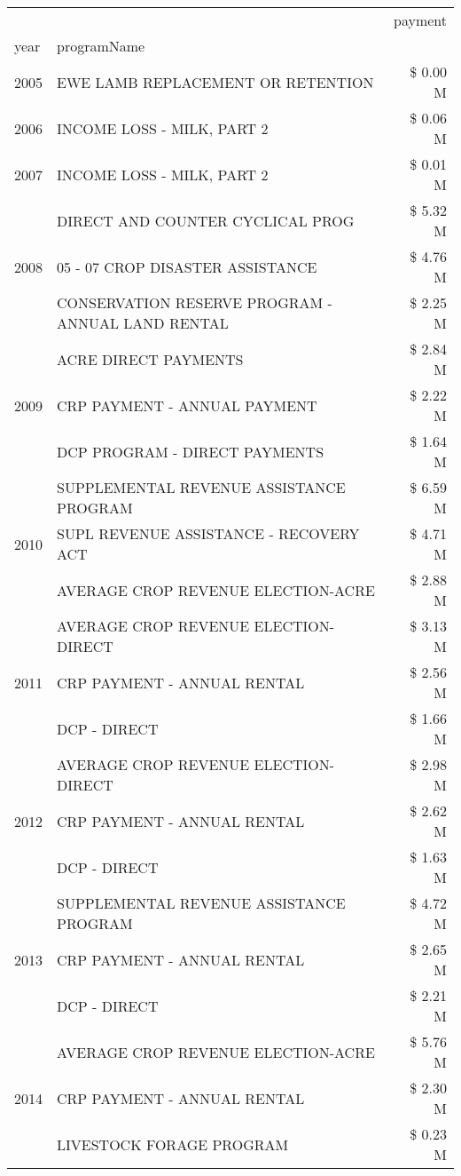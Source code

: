 \begin{tabular}{llr}
\toprule
 &  & payment \\
year & programName &  \\
\midrule
2005 & EWE LAMB REPLACEMENT OR RETENTION & \$ 0.00 M \\
\cline{1-3}
2006 & INCOME LOSS - MILK, PART 2 & \$ 0.06 M \\
\cline{1-3}
2007 & INCOME LOSS - MILK, PART 2 & \$ 0.01 M \\
\cline{1-3}
\multirow[t]{3}{*}{2008} & DIRECT AND COUNTER CYCLICAL PROG & \$ 5.32 M \\
 & 05 - 07 CROP DISASTER ASSISTANCE & \$ 4.76 M \\
 & CONSERVATION RESERVE PROGRAM - ANNUAL LAND RENTAL & \$ 2.25 M \\
\cline{1-3}
\multirow[t]{3}{*}{2009} & ACRE DIRECT PAYMENTS & \$ 2.84 M \\
 & CRP PAYMENT - ANNUAL PAYMENT & \$ 2.22 M \\
 & DCP PROGRAM - DIRECT PAYMENTS & \$ 1.64 M \\
\cline{1-3}
\multirow[t]{3}{*}{2010} & SUPPLEMENTAL REVENUE ASSISTANCE PROGRAM & \$ 6.59 M \\
 & SUPL REVENUE ASSISTANCE - RECOVERY ACT & \$ 4.71 M \\
 & AVERAGE CROP REVENUE ELECTION-ACRE & \$ 2.88 M \\
\cline{1-3}
\multirow[t]{3}{*}{2011} & AVERAGE CROP REVENUE ELECTION-DIRECT & \$ 3.13 M \\
 & CRP PAYMENT - ANNUAL RENTAL & \$ 2.56 M \\
 & DCP - DIRECT & \$ 1.66 M \\
\cline{1-3}
\multirow[t]{3}{*}{2012} & AVERAGE CROP REVENUE ELECTION-DIRECT & \$ 2.98 M \\
 & CRP PAYMENT - ANNUAL RENTAL & \$ 2.62 M \\
 & DCP - DIRECT & \$ 1.63 M \\
\cline{1-3}
\multirow[t]{3}{*}{2013} & SUPPLEMENTAL REVENUE ASSISTANCE PROGRAM & \$ 4.72 M \\
 & CRP PAYMENT - ANNUAL RENTAL & \$ 2.65 M \\
 & DCP - DIRECT & \$ 2.21 M \\
\cline{1-3}
\multirow[t]{3}{*}{2014} & AVERAGE CROP REVENUE ELECTION-ACRE & \$ 5.76 M \\
 & CRP PAYMENT - ANNUAL RENTAL & \$ 2.30 M \\
 & LIVESTOCK FORAGE PROGRAM & \$ 0.23 M \\

\end{tabular}
